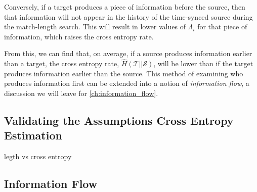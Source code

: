 Conversely, if a {\color{target}target} produces a piece of information before the {\color{source}source}, then that information will not appear in the history of the time-synced source during the match-length search. This will result in lower values of $\Lambda_i$ for that piece of information, which raises the cross entropy rate.

From this, we can find that, on average, if a {\color{source}source} produces information earlier than a {\color{target}target}, the cross entropy rate, $\hat{H}(\mathcal{T} || \mathcal{S})$, will be lower than if the {\color{target}target} produces information earlier than the {\color{source}source}. This method of examining who produces information first can be extended into a notion of \emph{information flow}, a discussion we will leave for \autoref{ch:information_flow}.



\subsection{Validating the Assumptions Cross Entropy Estimation}
legth vs cross entropy




\subsection{Information Flow}\label{ch:information_flow}


